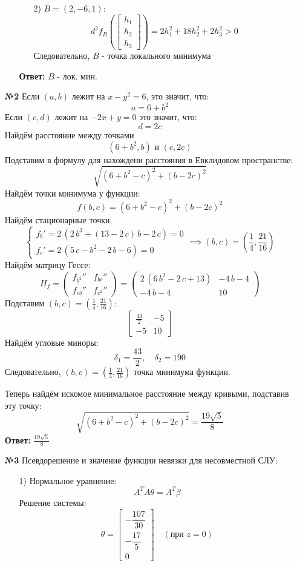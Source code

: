 \documentclass[a4paper]{article}
\newcommand{\mat}[1]{\begin{pmatrix} #1 \end{pmatrix}}
\newcommand{\matsq}[1]{\begin{bmatrix} #1 \end{bmatrix}}
\renewcommand{\f}[2]{\frac{#1}{#2}}
\newcommand{\case}[1]{\begin{cases} #1 \end{cases}}
\begin{document}
\begin{enumerate}
\begin{enumerate}
\begin{enumerate}
            \item[2)]$B= (2, -6, 1)$:
            $$d^2f_{B}\left(\matsq{h_1\\h_2\\h_3}\right) 
            = 2h_1^2+18h_2^2+2h_3^2 >0 $$
            Следовательно, $B$ - точка локального минимума
            
        \end{enumerate}
        \textbf{Ответ: } $B$ - лок. мин.\\
    \end{enumerate}

    \item[\textbf{№2}]Если $(a, b)$ лежит на $x-y^2 = 6$, это значит, что:
    $$a = 6+b^2$$
    Если $(c, d)$ лежит на $-2x+y=0$ это значит, что:
    $$d = 2c$$
    Найдём расстояние между точками
    $$(6+b^2, b) \text{ и } (c, 2c)$$
    Подставим в формулу для нахождени расстояния в Евклидовом пространстве:
    $$\sqrt{(6+b^2-c)^2 + (b-2c)^2}$$
    Найдём точки минимума у функции:
    $$f(b, c) = (6+b^2-c)^2 + (b-2c)^2$$
    Найдём стационарные точки:
    $$\case{
        f_b' = 2\,\left(2\,{b}^{3}+\left(13-2\,c\right)\,b-2\,c\right)=0\\
        f_c' = 2\,\left(5\,c-{b}^{2}-2\,b-6\right) = 0
    } \implies (b, c) = \left(\f{1}{4}, \f{21}{16}\right)$$
    Найдём матрицу Гессе:
    $$H_f = \mat{
        f_{b^2}'' & f_{bc}''\\
        f_{cb}'' & f_{c^2}''
    } = \mat{
        2\,\left(6\,{b}^{2}-2\,c+13\right) & -4\,b-4\\
        -4\,b-4 & 10
    }$$
    Подставим $(b, c) = \left(\f{1}{4}, \f{21}{16}\right)$:
    $$\begin{bmatrix}
        \frac{43}{2} & -5 \\
        -5 & 10
    \end{bmatrix}$$
    Найдём угловые миноры:
    $$\delta_1 = \f{43}{2}, \quad \delta_2 = 190$$
    Следовательно, $(b, c) = \left(\f{1}{4}, \f{21}{16}\right)$ точка минимума функции. 
    
    Теперь найдём искомое минимальное расстояние между кривыми, подставив эту точку:
    $$\sqrt{(6+b^2-c)^2 + (b-2c)^2} = \frac{19\sqrt{5}}{8}$$
    \textbf{Ответ: } $\frac{19\sqrt{5}}{8}$\\

    \item[\textbf{№3}]Псевдорешение и значение функции невязки для несовместной СЛУ:

    \begin{enumerate}
        \item[1)] Нормальное уравнение:  
           \[
           A^T A \theta = A^T \beta
           \]  
           Решение системы:  
           \[
           \theta = \begin{bmatrix}
           -\dfrac{107}{30} \\
           -\dfrac{17}{5} \\
           0
           \end{bmatrix} \quad (\text{при } z = 0)
           \]
        

\end{enumerate}
\end{enumerate}
\end{document}
